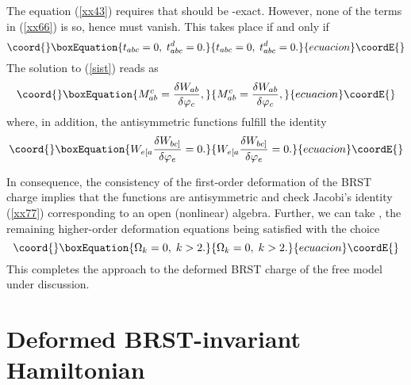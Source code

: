 \documentclass[a4paper,12pt]{article}
\begin{document}
The equation (\ref{xx43}) requires that \coordHE{} should
be \coordHE{}-exact. However, none of the terms in (\ref{xx66}) is so, hence \myHighlight{$%
\Delta $}\coordHE{} must vanish. This takes place if and only if 
\begin{equation}\coord{}\boxEquation{
t_{abc}=0,\;t_{abc}^{d}=0.  \label{sist}
}{
t_{abc}=0,\;t_{abc}^{d}=0.  }{ecuacion}\coordE{}\end{equation}
The solution to (\ref{sist}) reads as 
\begin{equation}\coord{}\boxEquation{
M_{ab}^{c}=\frac{\delta W_{ab}}{\delta \varphi _{c}},  \label{sol}
}{
M_{ab}^{c}=\frac{\delta W_{ab}}{\delta \varphi _{c}},  }{ecuacion}\coordE{}\end{equation}
where, in addition, the antisymmetric functions \coordHE{} fulfill the
identity 
\begin{equation}\coord{}\boxEquation{
W_{e[a}\frac{\delta W_{bc]}}{\delta \varphi _{e}}=0.  \label{xx77}
}{
W_{e[a}\frac{\delta W_{bc]}}{\delta \varphi _{e}}=0.  }{ecuacion}\coordE{}\end{equation}

In consequence, the consistency of the first-order deformation of the BRST
charge implies that the functions \coordHE{} are antisymmetric and check
Jacobi's identity (\ref{xx77}) corresponding to an open (nonlinear) algebra.
Further, we can take \coordHE{}, the remaining higher-order deformation
equations being satisfied with the choice 
\begin{equation}\coord{}\boxEquation{
\Omega _{k}=0,\;k>2.  \label{xx78}
}{
\Omega _{k}=0,\;k>2.  }{ecuacion}\coordE{}\end{equation}
This completes the approach to the deformed BRST charge of the free model
under discussion.

\section{Deformed BRST-invariant Hamiltonian}
\end{document}
